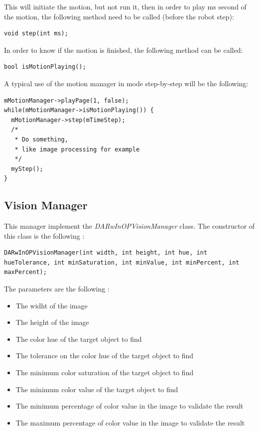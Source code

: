 \documentclass[a4paper, 12pt]{article}  		%
\begin{document}
This will initiate the motion, but not run it, then in order to play ms second of the motion, the following method need to be called (before the robot step):\\
\lstset{language=c++} 
\lstset{commentstyle=\textit} 
\begin{lstlisting} 
void step(int ms);
\end{lstlisting}

In order to know if the motion is finished, the following method can be called:\\
\lstset{language=c++} 
\lstset{commentstyle=\textit} 
\begin{lstlisting} 
bool isMotionPlaying();
\end{lstlisting}

A typical use of the motion manager in mode step-by-step will be the following:\\
\lstset{language=c++} 
\lstset{commentstyle=\textit} 
\begin{lstlisting} 
mMotionManager->playPage(1, false);
while(mMotionManager->isMotionPlaying()) {
  mMotionManager->step(mTimeStep);
  /*
   * Do something,
   * like image processing for example
   */
  myStep();
}
\end{lstlisting}

\newpage
\subsection{Vision Manager}
This manager implement the \textit{DARwInOPVisionManager} class. The constructor of this class is the following :\\

\lstset{language=c++} 
\lstset{commentstyle=\textit} 
\begin{lstlisting} 
DARwInOPVisionManager(int width, int height, int hue, int hueTolerance, int minSaturation, int minValue, int minPercent, int maxPercent);
\end{lstlisting}
The parameters are the following : \\
\begin{itemize}
\item The widht of the image
\item The height of the image
\item The color hue of the target object to find
\item The tolerance on the color hue of the target object to find
\item The minimum color saturation of the target object to find
\item The minimum color value of the target object to find
\item The minimum percentage of color value in the image to validate the result
\item The maximum percentage of color value in the image to validate the result
\end{itemize}
\end{document}
